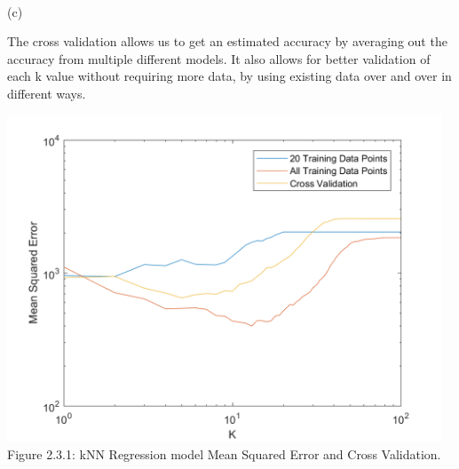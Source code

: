 \documentclass[]{report}   %
\begin{document}
~\\
(c) 

The cross validation allows us to get an estimated accuracy by averaging out the accuracy from multiple different models. It also allows for better validation of each k value without requiring more data, by using existing data over and over in different ways.

\begin{center}
	\includegraphics[width=35em]{2_3_Figure_1.png}
	{Figure 2.3.1: kNN Regression model Mean Squared Error and Cross Validation.}
\end{center} 
\end{document}
